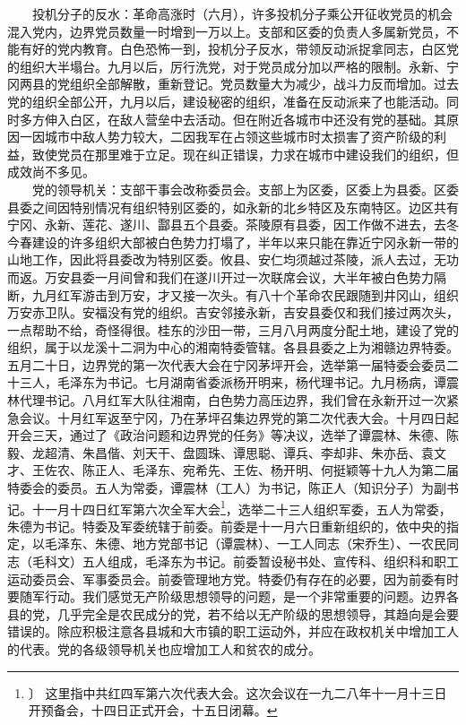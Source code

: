 \documentclass[cn,11pt,chinese]{elegantbook}
\begin{document}
　　投机分子的反水：革命高涨时（六月），许多投机分子乘公开征收党员的机会混入党内，边界党员数量一时增到一万以上。支部和区委的负责人多属新党员，不能有好的党内教育。白色恐怖一到，投机分子反水，带领反动派捉拿同志，白区党的组织大半塌台。九月以后，厉行洗党，对于党员成分加以严格的限制。永新、宁冈两县的党组织全部解散，重新登记。党员数量大为减少，战斗力反而增加。过去党的组织全部公开，九月以后，建设秘密的组织，准备在反动派来了也能活动。同时多方伸入白区，在敌人营垒中去活动。但在附近各城市中还没有党的基础。其原因一因城市中敌人势力较大，二因我军在占领这些城市时太损害了资产阶级的利益，致使党员在那里难于立足。现在纠正错误，力求在城市中建设我们的组织，但成效尚不多见。\\
　　党的领导机关：支部干事会改称委员会。支部上为区委，区委上为县委。区委县委之间因特别情况有组织特别区委的，如永新的北乡特区及东南特区。边区共有宁冈、永新、莲花、遂川、酃县五个县委。茶陵原有县委，因工作做不进去，去冬今春建设的许多组织大部被白色势力打塌了，半年以来只能在靠近宁冈永新一带的山地工作，因此将县委改为特别区委。攸县、安仁均须越过茶陵，派人去过，无功而返。万安县委一月间曾和我们在遂川开过一次联席会议，大半年被白色势力隔断，九月红军游击到万安，才又接一次头。有八十个革命农民跟随到井冈山，组织万安赤卫队。安福没有党的组织。吉安邻接永新，吉安县委仅和我们接过两次头，一点帮助不给，奇怪得很。桂东的沙田一带，三月八月两度分配土地，建设了党的组织，属于以龙溪十二洞为中心的湘南特委管辖。各县县委之上为湘赣边界特委。五月二十日，边界党的第一次代表大会在宁冈茅坪开会，选举第一届特委会委员二十三人，毛泽东为书记。七月湖南省委派杨开明来，杨代理书记。九月杨病，谭震林代理书记。八月红军大队往湘南，白色势力高压边界，我们曾在永新开过一次紧急会议。十月红军返至宁冈，乃在茅坪召集边界党的第二次代表大会。十月四日起开会三天，通过了《政治问题和边界党的任务》等决议，选举了谭震林、朱德、陈毅、龙超清、朱昌偕、刘天干、盘圆珠、谭思聪、谭兵、李却非、朱亦岳、袁文才、王佐农、陈正人、毛泽东、宛希先、王佐、杨开明、何挺颖等十九人为第二届特委会的委员。五人为常委，谭震林（工人）为书记，陈正人（知识分子）为副书记。十一月十四日红军第六次全军大会\footnote[25]{〕 这里指中共红四军第六次代表大会。这次会议在一九二八年十一月十三日开预备会，十四日正式开会，十五日闭幕。}，选举二十三人组织军委，五人为常委，朱德为书记。特委及军委统辖于前委。前委是十一月六日重新组织的，依中央的指定，以毛泽东、朱德、地方党部书记（谭震林）、一工人同志（宋乔生）、一农民同志（毛科文）五人组成，毛泽东为书记。前委暂设秘书处、宣传科、组织科和职工运动委员会、军事委员会。前委管理地方党。特委仍有存在的必要，因为前委有时要随军行动。我们感觉无产阶级思想领导的问题，是一个非常重要的问题。边界各县的党，几乎完全是农民成分的党，若不给以无产阶级的思想领导，其趋向是会要错误的。除应积极注意各县城和大市镇的职工运动外，并应在政权机关中增加工人的代表。党的各级领导机关也应增加工人和贫农的成分。\\
\end{document}

